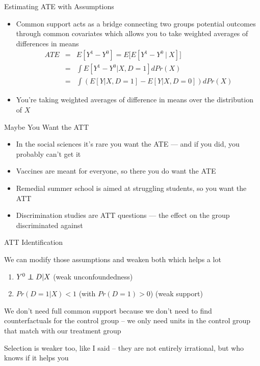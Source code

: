 \documentclass{beamer}
\newcommand\independent{\protect\mathpalette{\protect\independenT}{\perp}}
\def\independenT#1#2{\mathrel{\rlap{$#1#2$}\mkern2mu{#1#2}}}
\begin{document}
\begin{frame}{Estimating ATE with Assumptions}


	\begin{itemize}
	\item Common support acts as a bridge connecting two groups potential outcomes through common covariates which allows you to take weighted averages of differences in means
		\begin{eqnarray*}
		ATE &=&E[Y^1-Y^0] = E\bigg[ E[Y^1 - Y^0 \ \vert \ X] \bigg] \\
		&=& \int E[Y^1 - Y^0 |X,D=1] dPr(X) \\
		&=& \int \left(E[Y|X,D=1] - E[Y|X,D=0]\right)dPr(X)
		\end{eqnarray*}
	\item You're taking weighted averages of difference in means over the distribution of $X$
	\end{itemize}

\end{frame}




\begin{frame}{Maybe You Want the ATT}

\begin{itemize}
\item In the social sciences it's rare you want the ATE --- and if you did, you probably can't get it
\item Vaccines are meant for everyone, so there you do want the ATE
\item Remedial summer school is aimed at struggling students, so you want the ATT
\item Discrimination studies are ATT questions --- the effect on the group discriminated against
\end{itemize}

\end{frame}




\begin{frame}{ATT Identification}

We can modify those assumptions and weaken both which helps a lot

\begin{enumerate}
  \item $Y^0 \independent{D} | X$ (weak unconfoundedness)
  \item $Pr(D=1|X)<1$ (with $Pr(D=1)>0$) (weak support)
\end{enumerate}

\bigskip

We don't need full common support because we don't need to find counterfactuals for the control group -- we only need units in the control group that match with our treatment group

\bigskip

Selection is weaker too, like I said -- they are not entirely irrational, but who knows if it helps you

\end{frame}
\end{document}
